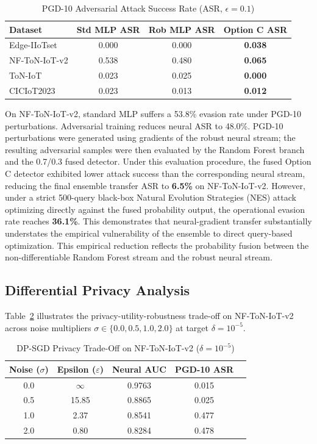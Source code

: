 \documentclass[10pt,journal,compsoc,twocolumn]{IEEEtran}
\begin{document}
\begin{table}[htbp]
\caption{PGD-10 Adversarial Attack Success Rate (ASR, $\epsilon=0.1$)}
\label{tab:adversarial_asr}
\centering
\begin{tabular}{lccc}
\toprule
\textbf{Dataset} & \textbf{Std MLP ASR} & \textbf{Rob MLP ASR} & \textbf{Option C ASR} \\
\midrule
Edge-IIoTset   & 0.000 & 0.000 & \textbf{0.038} \\
NF-ToN-IoT-v2  & 0.538 & 0.480 & \textbf{0.065} \\
ToN-IoT        & 0.023 & 0.025 & \textbf{0.000} \\
CICIoT2023     & 0.023 & 0.013 & \textbf{0.012} \\
\bottomrule
\end{tabular}
\end{table}

On NF-ToN-IoT-v2, standard MLP suffers a 53.8\% evasion rate under PGD-10 perturbations. Adversarial training reduces neural ASR to 48.0\%. PGD-10 perturbations were generated using gradients of the robust neural stream; the resulting adversarial samples were then evaluated by the Random Forest branch and the 0.7/0.3 fused detector. Under this evaluation procedure, the fused Option C detector exhibited lower attack success than the corresponding neural stream, reducing the final ensemble transfer ASR to \textbf{6.5\%} on NF-ToN-IoT-v2. However, under a strict 500-query black-box Natural Evolution Strategies (NES) attack optimizing directly against the fused probability output, the operational evasion rate reaches \textbf{36.1\%}. This demonstrates that neural-gradient transfer substantially understates the empirical vulnerability of the ensemble to direct query-based optimization. This empirical reduction reflects the probability fusion between the non-differentiable Random Forest stream and the robust neural stream.

\subsection{Differential Privacy Analysis}
Table~\ref{tab:dp_tradeoff} illustrates the privacy-utility-robustness trade-off on NF-ToN-IoT-v2 across noise multipliers $\sigma \in \{0.0, 0.5, 1.0, 2.0\}$ at target $\delta = 10^{-5}$.

\begin{table}[htbp]
\caption{DP-SGD Privacy Trade-Off on NF-ToN-IoT-v2 ($\delta=10^{-5}$)}
\label{tab:dp_tradeoff}
\centering
\begin{tabular}{ccccc}
\toprule
\textbf{Noise ($\sigma$)} & \textbf{Epsilon ($\varepsilon$)} & \textbf{Neural AUC} & \textbf{PGD-10 ASR} \\
\midrule
0.0 & $\infty$ & 0.9763 & 0.015 \\
0.5 & 15.85 & 0.8865 & 0.025 \\
1.0 & 2.37  & 0.8541 & 0.477 \\
2.0 & 0.80  & 0.8284 & 0.478 \\
\bottomrule
\end{tabular}
\end{table}
\end{document}
